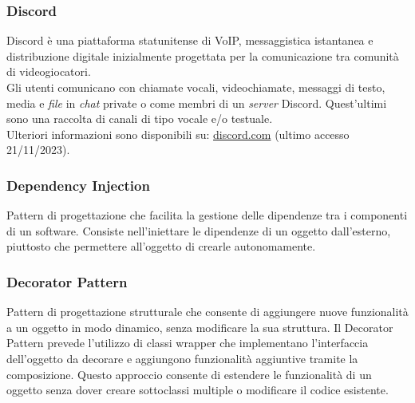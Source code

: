 \subsubsection*{Discord}
Discord è una piattaforma statunitense di VoIP, messaggistica istantanea e
distribuzione digitale inizialmente progettata per la comunicazione tra comunità
di videogiocatori.\\
Gli utenti comunicano con chiamate vocali, videochiamate, messaggi di testo,
media e \textit{file} in \textit{chat} private o come membri di un \textit{server}
Discord. Quest'ultimi sono una raccolta di canali di tipo vocale e/o testuale.\\
Ulteriori informazioni sono disponibili su:
\href{https://discord.com/}{discord.com} (ultimo accesso 21/11/2023).


\subsubsection*{Dependency Injection}
Pattern di progettazione che facilita la gestione delle dipendenze tra i componenti di un software. Consiste nell'iniettare le dipendenze di un oggetto dall'esterno, 
piuttosto che permettere all'oggetto di crearle autonomamente.

\subsubsection*{Decorator Pattern}
Pattern di progettazione strutturale che consente di aggiungere nuove funzionalità a un oggetto in modo dinamico, senza modificare la sua struttura.
Il Decorator Pattern prevede l'utilizzo di classi wrapper che implementano l'interfaccia dell'oggetto da decorare e aggiungono funzionalità aggiuntive tramite la 
composizione. Questo approccio consente di estendere le funzionalità di un oggetto senza dover creare sottoclassi multiple o modificare il codice esistente.

\newpage
